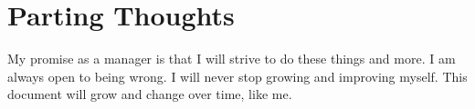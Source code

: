 \documentclass[11pt]{amsart}
\begin{document}








\section*{Parting Thoughts}
My promise as a manager is that I will strive to do these things and more. I am always open to being wrong. I will never stop growing and improving myself. This document will grow and change over time, like me.

\end{document}
